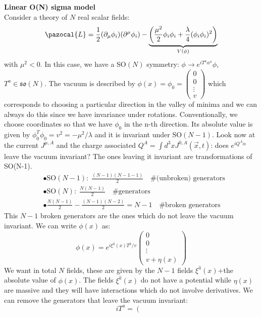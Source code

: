 \documentclass[../main.tex]{subfiles}
\begin{document}
\begin{example}
\textbf{Linear O(N) sigma model}\\
Consider a theory of $N$ real scalar fields:
\[
\pazocal{L}=\frac{1}{2}(\partial_\mu\phi_i)(\partial^\mu\phi_i)-\underbrace{\left(\frac{\mu^2}{2}\phi_i\phi_i+\frac{\lambda}{4}(\phi_i\phi_i)^2\right)}_{V(\phi)}
\]
with $\mu^2<0$. In this case, we have a SO$(N)$ symmetry: $\phi\to e^{iT^a\alpha^a}\phi$, $T^a\in\mathfrak{so}(N)$. The vacuum is described by $\phi(x)=\phi_0=\begin{pmatrix}0\\0\\ \vdots\\v\end{pmatrix}$ which corresponds to choosing a particular direction in the valley of minima and we can always do this since we have invariance under rotations. Conventionally, we choose coordinates so that we have $\phi_0$ in the n-th direction. Its absolute value is given by $\phi_0^T\phi_0=v^2=-\mu^2/\lambda$ and it is invariant under SO$(N-1)$. Look now at the current $J^{\mu,A}$ and the charge associated $Q^A=\int d^3xJ^{0,A}(\Vec{x},t)$: does $e^{iQ^A\alpha}$ leave the vacuum invariant? The ones leaving it invariant are transformations of SO(N-1).
\begin{align*}
&\bullet \text{SO}(N-1):\; \frac{(N-1)(N-1-1)}{2} \quad \text{\# (unbroken) generators}\\
&\bullet \text{SO}(N):\;\frac{N(N-1)}{2} \quad \text{\# generators}\\
&\bullet \frac{N(N-1)}{2}-\frac{(N-1)(N-2)}{2}=N-1 \quad \text{\# broken generators}
\end{align*}
This $N-1$ broken generators are the ones which do not leave the vacuum invariant. We can write $\phi(x)$ as:
\[
\phi(x)=e^{i\xi^{\hat{a}}(x)T^{\hat{a}}/v}\begin{pmatrix}0\\0\\ \vdots\\v+\eta(x)\end{pmatrix}
\]
We want in total $N$ fields, these are given by the $N-1$ fields $\xi^{\hat{a}}(x)$+the absolute value of $\phi(x)$. The fields $\xi^{\hat{a}}(x)$ do not have a potential while $\eta(x)$ are massive and they will have interactions which do not involve derivatives. We can remove the generators that leave the vacuum invariant:
\[
iT^a=\left(
\begin{array}{cccc}

\end{array}\]
\end{example}
\end{document}

